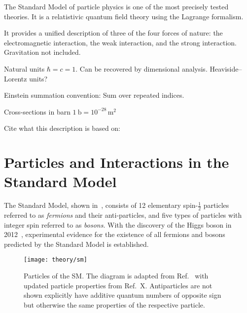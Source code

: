 The Standard Model of particle physics is one of the most precisely tested
theories. It is a relatistivic quantum field theory using the Lagrange
formalism.

It provides a unified description of three of the four forces of nature: the
electromagnetic interaction, the weak interaction, and the strong
interaction. Gravitation not included.

Natural units $\hbar = c = 1$. Can be recovered by dimensional
analysis. Heaviside--Lorentz units?

Einstein summation convention: Sum over repeated indices.

Cross-sections in barn $\SI{1}{\barn} = 10^{-28}\,\si{\metre\squared}$

Cite what this description is based on: \cite{Halzen:1984mc,Thomson:2013zua}


\section{Particles and Interactions in the Standard Model}

The Standard Model, shown in~, consists of 12 elementary
spin-$\frac{1}{2}$ particles referred to as \emph{fermions} and their
anti-particles, and five types of particles with integer spin referred to as
\emph{bosons}. With the discovery of the Higgs boson in
2012~\cite{HIGG-2012-27,CMS-HIG-12-028}, experimental evidence for the existence
of all fermions and bosons predicted by the Standard Model is established.

\begin{figure}[htbp]
  \centering

  \texttt{[image: theory/sm]}

  \caption{Particles of the SM. The diagram is adapted from Ref.~\cite{sm_tikz}
    with updated particle properties from Ref.~X. Antiparticles are not shown
    explicitly have additive quantum numbers of opposite sign but otherwise the
    same properties of the respective particle.}
  \label{fig:sm_particles}
\end{figure}


